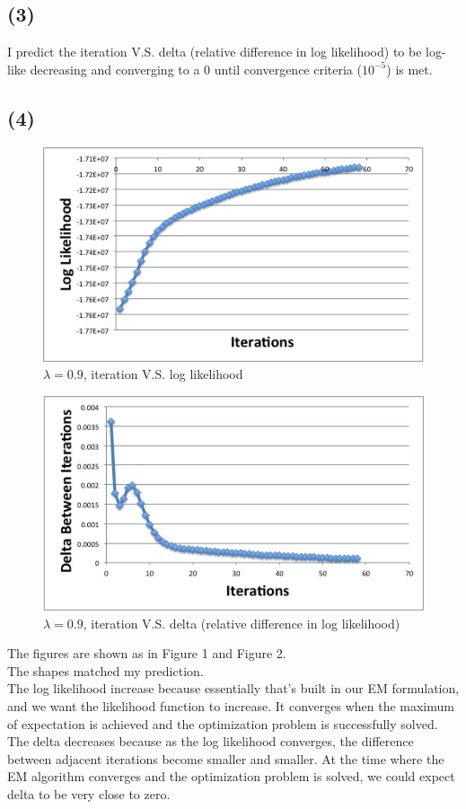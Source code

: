 \subsection*{(3)}
I predict the iteration V.S. delta (relative difference in log likelihood) to be log-like decreasing and converging to a 0 until convergence criteria ($10^{-5}$) is met. 

\subsection*{(4)}
\begin{figure}[!ht]
  \centering
    \includegraphics[width=\textwidth]{Lambda09Round1LogLikelihood.jpg}
      \caption{$\lambda = 0.9$, iteration V.S. log likelihood}
\end{figure}

\begin{figure}[!ht]
  \centering
    \includegraphics[width=\textwidth]{Lambda09Round1Delta.jpg}
      \caption{$\lambda = 0.9$, iteration V.S. delta (relative difference in log likelihood)}
\end{figure}
The figures are shown as in Figure 1 and Figure 2. \\
The shapes matched my prediction. \\
The log likelihood increase because essentially that's built in our EM formulation, and we want the likelihood function to increase. It converges when the maximum of expectation is achieved and the optimization problem is successfully solved. \\
The delta decreases because as the log likelihood converges, the difference between adjacent iterations become smaller and smaller. At the time where the EM algorithm converges and the optimization problem is solved, we could expect delta to be very close to zero.

